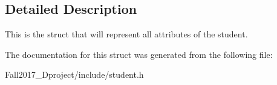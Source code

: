 \subsection{Detailed Description}
This is the struct that will represent all attributes of the student. 

The documentation for this struct was generated from the following file\+:\begin{DoxyCompactItemize}
\item 
Fall2017\+\_\+Dproject/include/student.\+h\end{DoxyCompactItemize}
